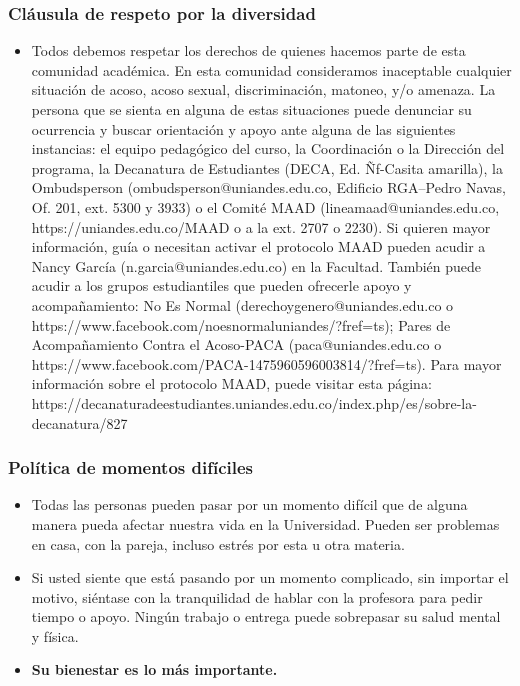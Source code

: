 \documentclass[
  shownotes,
  xcolor={svgnames},
  hyperref={colorlinks,citecolor=DarkBlue,linkcolor=DarkRed,urlcolor=DarkBlue}
  ]{beamer}
\begin{document}
\begin{frame}
\frametitle{Cláusula de respeto por la diversidad}

\begin{itemize}
  \footnotesize
\item  Todos debemos respetar los derechos de quienes hacemos parte de esta comunidad académica. En esta comunidad consideramos inaceptable cualquier situación de acoso, acoso sexual, discriminación, matoneo, y/o amenaza. La persona que se sienta en alguna de estas situaciones puede denunciar su ocurrencia y buscar orientación y apoyo ante alguna de las siguientes instancias: el equipo pedagógico del curso, la Coordinación o la Dirección del programa, la Decanatura de Estudiantes (DECA, Ed. Ñf-Casita amarilla), la Ombudsperson (ombudsperson@uniandes.edu.co, Edificio RGA–Pedro Navas, Of. 201, ext. 5300 y 3933) o el Comité MAAD (lineamaad@uniandes.edu.co, https://uniandes.edu.co/MAAD o a la ext. 2707 o 2230). Si quieren mayor información, guía o necesitan activar el protocolo MAAD pueden acudir a Nancy García (n.garcia@uniandes.edu.co) en la Facultad. También puede acudir a los grupos estudiantiles que pueden ofrecerle apoyo y acompañamiento: No Es Normal (derechoygenero@uniandes.edu.co o https://www.facebook.com/noesnormaluniandes/?fref=ts); Pares de Acompañamiento Contra el Acoso-PACA (paca@uniandes.edu.co o https://www.facebook.com/PACA-1475960596003814/?fref=ts). Para mayor información sobre el protocolo MAAD, puede visitar esta página: https://decanaturadeestudiantes.uniandes.edu.co/index.php/es/sobre-la-decanatura/827
\end{itemize}
\end{frame}
\begin{frame}
\frametitle{Política de momentos difíciles}

\begin{itemize}
\item Todas las personas pueden pasar por un momento difícil que de alguna manera pueda afectar nuestra vida en la Universidad. Pueden ser problemas en casa, con la pareja, incluso estrés por esta u otra materia.
\medskip
\item Si usted siente que está pasando por un momento complicado, sin importar el motivo, siéntase con la tranquilidad de hablar con la profesora para pedir tiempo o apoyo. Ningún trabajo o entrega puede sobrepasar su salud mental y física.
\medskip
 \item {\bf Su bienestar es lo más importante.}
\end{itemize}
\end{frame}
\end{document}
